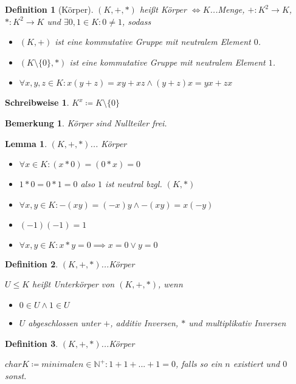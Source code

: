 \documentclass[twocolumn]{article}
\newtheorem{lemma}[theorem]{Lemma}
\newtheorem{definition}{Definition}[section]
\newtheorem*{remark}{Bemerkung}
\newtheorem*{schreibweise}{Schreibweise}
\newcommand*{\logeq}{\Leftrightarrow}
\begin{document}
\begin{definition}[Körper]
	$(K,+,*)$ heißt Körper $\logeq K$...Menge, $+:K^{2}\rightarrow K$, $*:K^{2}\rightarrow K$ und $\exists 0, 1 \in K : 0 \neq 1$, sodass
	
	\begin{itemize}
		\item $(K,+)$ ist eine kommutative Gruppe mit neutralem Element $0$.
		\item $(K\setminus \{0\},*)$ ist eine kommutative Gruppe mit neutralem Element $1$.
		\item $\forall x,y,z \in K : x(y+z)=xy+xz \land (y+z)x=yx+zx$
	\end{itemize}
\end{definition}

\begin{schreibweise}
	$K^{x}\coloneqq K\setminus\{0\}$
\end{schreibweise}

\begin{remark}
	Körper sind Nullteiler frei.
\end{remark}

\begin{lemma}
	$(K,+,*)$... Körper
	
	\begin{itemize}
		\item $\forall x \in K : (x*0)=(0*x)=0$
		\item $1*0=0*1=0$ also $1$ ist neutral bzgl. $(K,*)$
		\item $\forall x,y \in K : -(xy)=(-x)y \land -(xy)=x(-y)$
		\item $(-1)(-1)=1$
		\item $\forall x,y \in K : x*y=0 \implies x = 0 \lor y = 0$
	\end{itemize}
\end{lemma}

\begin{definition}
	$(K,+,*)$...Körper
	
	$U \leq K$ heißt Unterkörper von $(K,+,*)$, wenn
	
	\begin{itemize}
		\item $0 \in U \land 1 \in U$
		\item $U$ abgeschlossen unter $+$, additiv Inversen, $*$ und multiplikativ Inversen
	\end{itemize}
\end{definition}

\begin{definition}
	$(K,+,*)$...Körper
	
	$char K \coloneqq minimale n \in \mathbb{N}^{+} : 1+1+...+1=0$, falls so ein $n$ existiert und $0$ sonst.
\end{definition}
\end{document}
